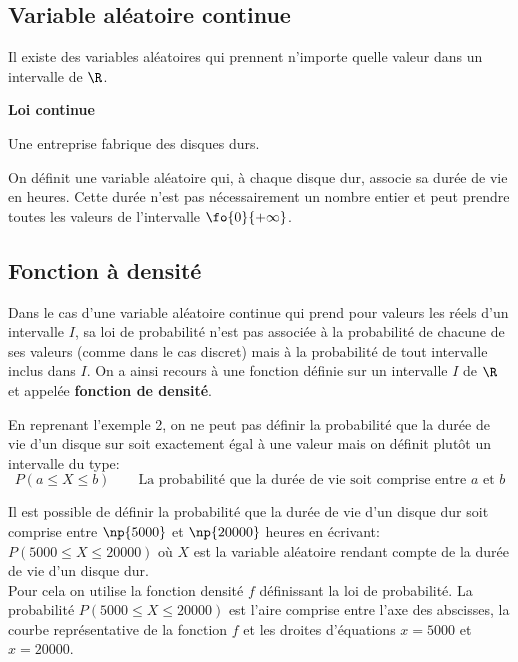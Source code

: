 \documentclass[a4paper,12pt,openany]{book}
\begin{document}
\subsection{Variable aléatoire continue}

Il existe des variables aléatoires qui prennent n'importe quelle valeur dans un intervalle de $\R$.

\bigskip

\exemple \quad \textbf{Loi continue}

Une entreprise fabrique des disques durs.

On définit une variable aléatoire qui, à chaque disque dur, associe sa durée de vie en heures. Cette durée n'est pas nécessairement un nombre entier et peut prendre toutes les valeurs de l'intervalle $\fo{0}{+\infty}$. 

\subsection{Fonction à densité}

Dans le cas d'une variable aléatoire continue qui prend pour valeurs les réels d'un intervalle $I$, sa loi de probabilité n'est pas associée à la probabilité de chacune de ses valeurs (comme dans le cas discret) mais à la probabilité de tout intervalle inclus dans $I$. On a ainsi recours à une fonction définie sur un intervalle $I$ de $\R$ et appelée \textbf{fonction de densité}.

\medskip

En reprenant l'exemple 2, on ne peut pas définir la probabilité que la durée de vie d'un disque sur soit exactement égal à une valeur mais on définit plutôt un intervalle du type:
$$P(a \leqslant X \leqslant b) \qquad \text{La probabilité que la durée de vie soit comprise entre $a$ et $b$}$$


\bigskip

\exemple Il est possible de définir la probabilité que la durée de vie d'un disque dur soit comprise entre $\np{5000}$ et $\np{20000}$ heures en écrivant: $P(5000 \leqslant X \leqslant 20000)$ où $X$ est la variable aléatoire rendant compte de la durée de vie d'un disque dur.\\

Pour cela on utilise la fonction densité $f$ définissant la loi de probabilité. La probabilité $P(5000 \leqslant X \leqslant 20000)$ est l'aire comprise entre l'axe des abscisses, la courbe représentative de la fonction $f$ et les droites d'équations $x=5000$ et $x=20000$.
\end{document}
